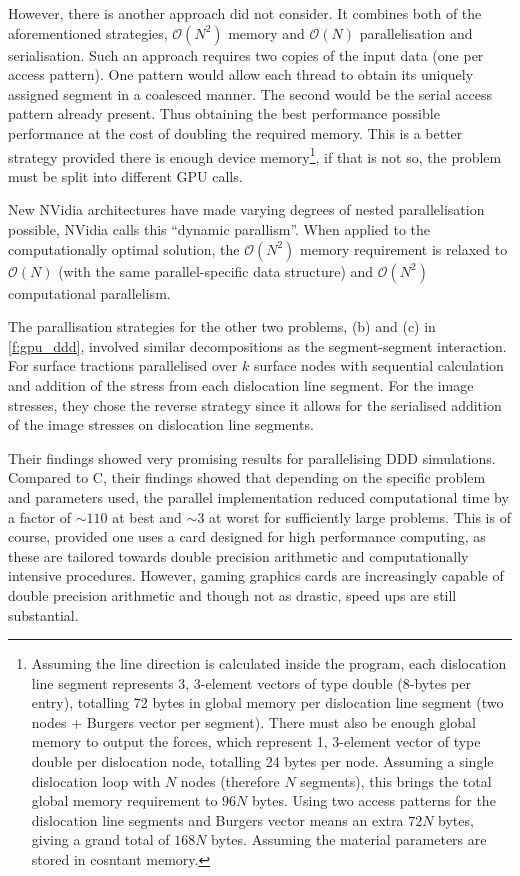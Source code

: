 However, there is another approach \citet{gpu_ddd} did not consider. It combines both of the aforementioned strategies, $ \mathcal{O}(N^{2}) $ memory and $ \mathcal{O}(N) $ parallelisation and serialisation. Such an approach requires two copies of the input data (one per access pattern). One pattern would allow each thread to obtain its uniquely assigned segment in a coalesced manner. The second would be the serial access pattern already present. Thus obtaining the best performance possible performance at the cost of doubling the required memory. This is a better strategy provided there is enough device memory\footnote{Assuming the line direction is calculated inside the program, each dislocation line segment represents 3, 3-element vectors of type double (8-bytes per entry), totalling 72 bytes in global memory per dislocation line segment (two nodes + Burgers vector per segment). There must also be enough global memory to output the forces, which represent 1, 3-element vector of type double per dislocation node, totalling 24 bytes per node. Assuming a single dislocation loop with $ N $ nodes (therefore $ N $ segments), this brings the total global memory requirement to $ 96N $ bytes. Using two access patterns for the dislocation line segments and Burgers vector means an extra $ 72N $ bytes, giving a grand total of $ 168N $ bytes. Assuming the material parameters are stored in cosntant memory.}, if that is not so, the problem must be split into different GPU calls.

New NVidia architectures have made varying degrees of nested parallelisation possible, NVidia calls this ``dynamic parallism''. When applied to the computationally optimal solution, the $ \mathcal{O}(N^{2}) $ memory requirement is relaxed to $ \mathcal{O}(N) $ (with the same parallel-specific data structure) and $ \mathcal{O}(N^{2}) $ computational parallelism.

The parallisation strategies for the other two problems, (b) and (c) in \cref{f:gpu_ddd}, involved similar decompositions as the segment-segment interaction. For surface tractions \citet{gpu_ddd} parallelised over $ k $ surface nodes with sequential calculation and addition of the stress from each dislocation line segment. For the image stresses, they chose the reverse strategy since it allows for the serialised addition of the image stresses on dislocation line segments.

Their findings showed very promising results for parallelising DDD simulations. Compared to C, their findings showed that depending on the specific problem and parameters used, the parallel implementation reduced computational time by a factor of $ \sim 110 $ at best and $ \sim 3 $ at worst for sufficiently large problems. This is of course, provided one uses a card designed for high performance computing, as these are tailored towards double precision arithmetic and computationally intensive procedures. However, gaming graphics cards are increasingly capable of double precision arithmetic and though not as drastic, speed ups are still substantial.

